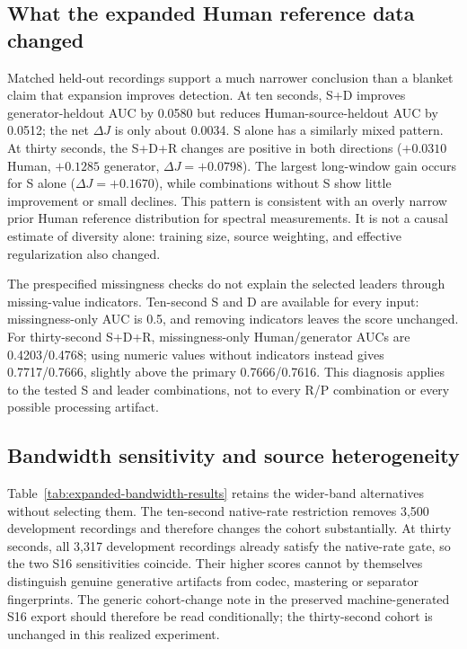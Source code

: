 \subsection{What the expanded Human reference data changed}

Matched held-out recordings support a much narrower conclusion than a blanket
claim that expansion improves detection. At ten seconds, S+D improves
generator-heldout AUC by 0.0580 but reduces Human-source-heldout AUC by 0.0512;
the net $\Delta J$ is only about 0.0034. S alone has a similarly mixed pattern.
At thirty seconds, the S+D+R changes are positive in both directions
($+0.0310$ Human, $+0.1285$ generator, $\Delta J=+0.0798$). The largest long-window
gain occurs for S alone ($\Delta J=+0.1670$), while combinations without S show
little improvement or small declines. This pattern is consistent with an
overly narrow prior Human reference distribution for spectral measurements.
It is not a causal estimate of diversity alone: training size, source weighting,
and effective regularization also changed.

\begin{table}[htbp]
\centering\small\setlength{\tabcolsep}{4pt}
\caption{Ten-second expanded-minus-prior comparison on matched held-out inputs.}

\bigskip
\caption{Thirty-second expanded-minus-prior comparison on matched held-out inputs.}

\end{table}

The prespecified missingness checks do not explain the selected leaders through
missing-value indicators. Ten-second S and D are available for every input:
missingness-only AUC is 0.5, and removing indicators leaves the score unchanged.
For thirty-second S+D+R, missingness-only Human/generator AUCs are 0.4203/0.4768;
using numeric values without indicators instead gives 0.7717/0.7666, slightly
above the primary 0.7666/0.7616. This diagnosis applies to the tested S and leader
combinations, not to every R/P combination or every possible processing artifact.

\subsection{Bandwidth sensitivity and source heterogeneity}

Table~\ref{tab:expanded-bandwidth-results} retains the wider-band alternatives
without selecting them. The ten-second native-rate restriction removes 3,500
development recordings and therefore changes the cohort substantially. At thirty
seconds, all 3,317 development recordings already satisfy the native-rate gate,
so the two S16 sensitivities coincide. Their higher scores cannot by themselves
distinguish genuine generative artifacts from codec, mastering or separator
fingerprints. The generic cohort-change note in the preserved machine-generated
S16 export should therefore be read conditionally; the thirty-second cohort is
unchanged in this realized experiment.

